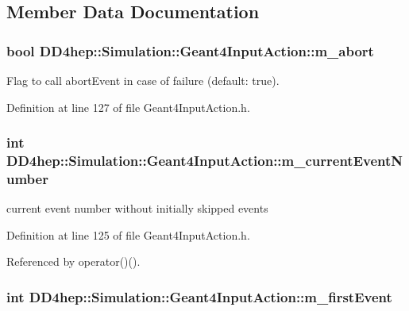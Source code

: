 \subsection{Member Data Documentation}
\hypertarget{class_d_d4hep_1_1_simulation_1_1_geant4_input_action_a87b795b22ac455154122b4f210abf133}{
\subsubsection[{m\_\-abort}]{\setlength{\rightskip}{0pt plus 5cm}bool {\bf DD4hep::Simulation::Geant4InputAction::m\_\-abort}}}
\label{class_d_d4hep_1_1_simulation_1_1_geant4_input_action_a87b795b22ac455154122b4f210abf133}


Flag to call abortEvent in case of failure (default: true). 

Definition at line 127 of file Geant4InputAction.h.\hypertarget{class_d_d4hep_1_1_simulation_1_1_geant4_input_action_a4b4cae1c79483e6f32ad70671984e422}{
\subsubsection[{m\_\-currentEventNumber}]{\setlength{\rightskip}{0pt plus 5cm}int {\bf DD4hep::Simulation::Geant4InputAction::m\_\-currentEventNumber}}}
\label{class_d_d4hep_1_1_simulation_1_1_geant4_input_action_a4b4cae1c79483e6f32ad70671984e422}


current event number without initially skipped events 

Definition at line 125 of file Geant4InputAction.h.

Referenced by operator()().\hypertarget{class_d_d4hep_1_1_simulation_1_1_geant4_input_action_a461a33c7eb46401092940394d40d99d7}{
\subsubsection[{m\_\-firstEvent}]{\setlength{\rightskip}{0pt plus 5cm}int {\bf DD4hep::Simulation::Geant4InputAction::m\_\-firstEvent}}}
\label{class_d_d4hep_1_1_simulation_1_1_geant4_input_action_a461a33c7eb46401092940394d40d99d7}


